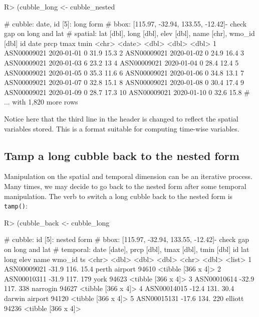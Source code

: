 \documentclass[
]{jss}
\begin{document}
\begin{CodeChunk}
\begin{CodeInput}
R> (cubble_long <- cubble_nested %
\end{CodeInput}
\begin{CodeOutput}
# cubble:  date, id [5]: long form
# bbox:    [115.97, -32.94, 133.55, -12.42]- check gap on long and lat
# spatial: lat [dbl], long [dbl], elev [dbl], name [chr], wmo_id [dbl]
   id          date        prcp  tmax  tmin
   <chr>       <date>     <dbl> <dbl> <dbl>
 1 ASN00009021 2020-01-01     0  31.9  15.3
 2 ASN00009021 2020-01-02     0  24.9  16.4
 3 ASN00009021 2020-01-03     6  23.2  13  
 4 ASN00009021 2020-01-04     0  28.4  12.4
 5 ASN00009021 2020-01-05     0  35.3  11.6
 6 ASN00009021 2020-01-06     0  34.8  13.1
 7 ASN00009021 2020-01-07     0  32.8  15.1
 8 ASN00009021 2020-01-08     0  30.4  17.4
 9 ASN00009021 2020-01-09     0  28.7  17.3
10 ASN00009021 2020-01-10     0  32.6  15.8
# ... with 1,820 more rows
\end{CodeOutput}
\end{CodeChunk}

Notice here that the third line in the header is changed to reflect the
spatial variables stored. This is a format suitable for computing
time-wise variables.

\hypertarget{tamp-a-long-cubble-back-to-the-nested-form}{%
\subsection{Tamp a long cubble back to the nested
form}\label{tamp-a-long-cubble-back-to-the-nested-form}}

Manipulation on the spatial and temporal dimension can be an iterative
process. Many times, we may decide to go back to the nested form after
some temporal manipulation. The verb to switch a long cubble back to the
nested form is \texttt{tamp()}:

\begin{CodeChunk}
\begin{CodeInput}
R> (cubble_back <- cubble_long %
\end{CodeInput}
\begin{CodeOutput}
# cubble:   id [5]: nested form
# bbox:     [115.97, -32.94, 133.55, -12.42]- check gap on long and lat
# temporal: date [date], prcp [dbl], tmax [dbl], tmin [dbl]
  id            lat  long  elev name           wmo_id ts                
  <chr>       <dbl> <dbl> <dbl> <chr>           <dbl> <list>            
1 ASN00009021 -31.9  116.  15.4 perth airport   94610 <tibble [366 x 4]>
2 ASN00010311 -31.9  117. 179   york            94623 <tibble [366 x 4]>
3 ASN00010614 -32.9  117. 338   narrogin        94627 <tibble [366 x 4]>
4 ASN00014015 -12.4  131.  30.4 darwin airport  94120 <tibble [366 x 4]>
5 ASN00015131 -17.6  134. 220   elliott         94236 <tibble [366 x 4]>
\end{CodeOutput}
\end{CodeChunk}
\end{document}
